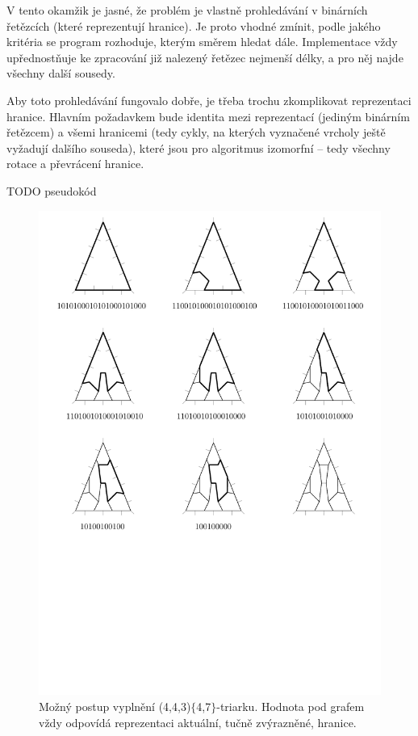 V tento okamžik je jasné, že problém je vlastně prohledávání v binárních řetězcích (které reprezentují hranice). Je proto vhodné zmínit, podle jakého kritéria se program rozhoduje, kterým směrem hledat dále. Implementace vždy upřednostňuje ke zpracování již nalezený řetězec nejmenší délky, a pro něj najde všechny další sousedy.

Aby toto prohledávání fungovalo dobře, je třeba trochu zkomplikovat reprezentaci hranice. Hlavním požadavkem bude identita mezi reprezentací (jediným binárním řetězcem) a všemi hranicemi (tedy cykly, na kterých vyznačené vrcholy ještě vyžadují dalšího souseda), které jsou pro algoritmus izomorfní -- tedy všechny rotace a převrácení hranice.

TODO pseudokód

\begin{figure}[h!]\centering
\includegraphics[width=\textwidth]{../img/reseni}
\caption{Možný postup vyplnění (4,4,3)$\lbrace$4,7$\rbrace$-triarku. Hodnota pod grafem vždy odpovídá reprezentaci aktuální, tučně zvýrazněné, hranice.}
\label{obr03:reseni}
\end{figure}


